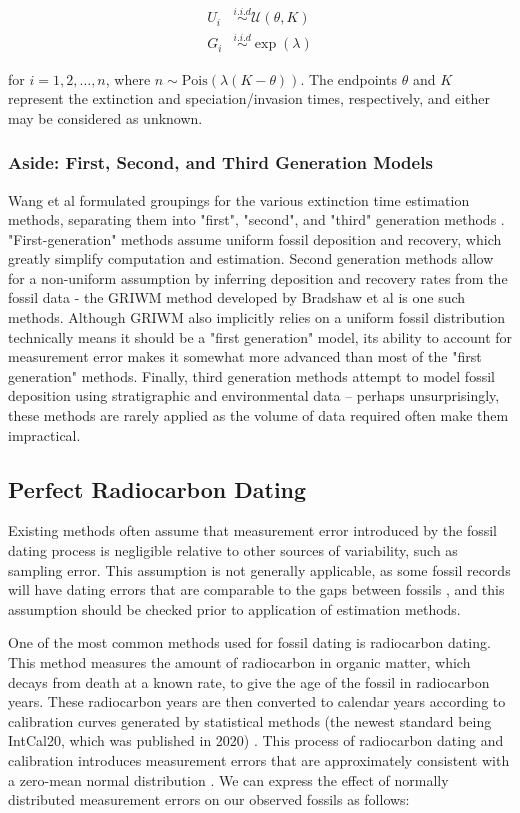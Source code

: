 \begin{align*}
    U_i  &\overset{i.i.d}{\sim} \mathcal{U}(\theta, K) \\
    G_i &\overset{i.i.d}{\sim} \exp{(\lambda)}
\end{align*}

for $i = 1, 2, \dots, n$, where  $n \sim \textrm{Pois}(\lambda(K-\theta))$. The endpoints $\theta$ and $K$ represent the extinction and speciation/invasion times, respectively, and either may be considered as unknown.

\subsubsection{Aside: First, Second, and Third Generation Models}

Wang et al formulated groupings for the various extinction time estimation methods, separating them into "first", "second", and "third" generation methods \parencite{Wang2016}. "First-generation" methods assume uniform fossil deposition and recovery, which greatly simplify computation and estimation. Second generation methods allow for a non-uniform assumption by inferring deposition and recovery rates from the fossil data - the GRIWM method developed by Bradshaw et al \parencite{Bradshaw2012} is one such methods. Although GRIWM also implicitly relies on a uniform fossil distribution technically means it should be a "first generation" model, its ability to account for measurement error makes it somewhat more advanced than most of the "first generation" methods. Finally, third generation methods attempt to model fossil deposition using stratigraphic and environmental data -- perhaps unsurprisingly, these methods are rarely applied as  the volume of data required often make them impractical.

\subsection{Perfect Radiocarbon Dating}

Existing methods often assume that measurement error introduced by the fossil dating process is negligible relative to other sources of variability, such as sampling error. This assumption is not generally applicable, as some fossil records will have dating errors that are comparable to the gaps between fossils \parencite{Solow2006}, and this assumption should be checked prior to application of estimation methods.

One of the most common methods used for fossil dating is radiocarbon dating. This method measures the amount of radiocarbon in organic matter, which decays from death at a known rate, to give the age of the fossil in radiocarbon years. These radiocarbon years are then converted to calendar years according to calibration curves generated by statistical methods (the newest standard being IntCal20, which was published in 2020) \parencite{Reimer2020}. This process of radiocarbon dating and calibration introduces measurement errors that are approximately consistent with a zero-mean normal distribution \parencite{Walker2005Quaternary}. We can express the effect of normally distributed measurement errors on our observed fossils as follows:

